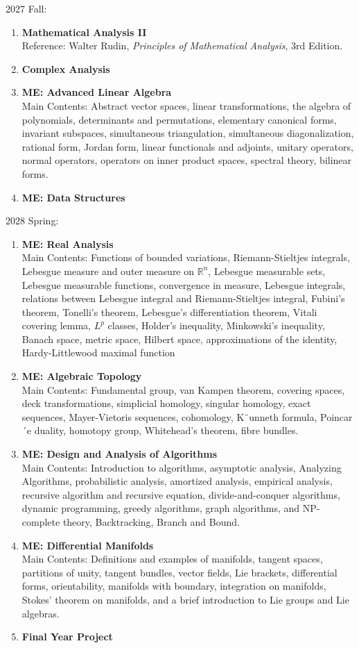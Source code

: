 \documentclass{scrartcl}
\newcommand{\R}{{\mathbb R}}
\begin{document}
2027 Fall:
\begin{enumerate}
    \item \textbf{Mathematical Analysis II}
    \\Reference: Walter Rudin, \textit{Principles of Mathematical Analysis}, 3rd Edition.
    \item \textbf{Complex Analysis}
    \item \textbf{ME: Advanced Linear Algebra}
    \\Main Contents:  Abstract
vector spaces, linear transformations, the algebra of polynomials,
determinants and permutations, elementary canonical forms,
invariant subspaces, simultaneous triangulation, simultaneous
diagonalization, rational form, Jordan form, linear functionals and
adjoints, unitary operators, normal operators, operators on inner
product spaces, spectral theory, bilinear forms.
    \item \textbf{ME: Data Structures} \label{sec:ME:Data Structures}
\end{enumerate}




2028 Spring:
\begin{enumerate}
    \item \textbf{ME: Real Analysis}
    \\Main Contents: Functions of bounded variations, Riemann-Stieltjes
integrals, Lebesgue measure and outer measure on $\R^n$, Lebesgue
measurable sets, Lebesgue measurable functions, convergence in
measure, Lebesgue integrals, relations between Lebesgue integral
and Riemann-Stieltjes integral, Fubini's theorem, Tonelli's theorem,
Lebesgue's differentiation theorem, Vitali covering lemma, $L^p$
classes, Holder's inequality, Minkowski's inequality, Banach space,
metric space, Hilbert space, approximations of the identity,
Hardy-Littlewood maximal function
    \item \textbf{ME: Algebraic Topology}
    \\Main Contents: Fundamental
group, van Kampen theorem, covering spaces, deck
transformations, simplicial homology, singular homology, exact
sequences, Mayer-Vietoris sequences, cohomology, K¨unneth
formula, Poincar´e duality, homotopy group, Whitehead’s theorem,
fibre bundles.
    \item \textbf{ME: Design and Analysis of Algorithms}
    \\Main Contents: Introduction to algorithms, asymptotic analysis,
Analyzing Algorithms, probabilistic analysis, amortized analysis,
empirical analysis, recursive algorithm and recursive equation,
divide-and-conquer algorithms, dynamic programming, greedy
algorithms, graph algorithms, and NP-complete theory,
Backtracking, Branch and Bound.
    \item \textbf{ME: Differential Manifolds}
    \\Main Contents: Definitions and examples of manifolds, tangent spaces, partitions of
unity, tangent bundles, vector fields, Lie brackets, differential
forms, orientability, manifolds with boundary, integration on
manifolds, Stokes' theorem on manifolds, and a brief introduction
to Lie groups and Lie algebras.
    \item \textbf{Final Year Project}
\end{enumerate}
\end{document}

